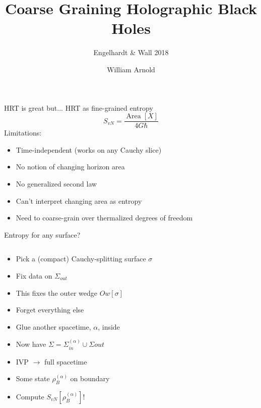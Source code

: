 \documentclass{beamer}
\title{Coarse Graining Holographic Black Holes}
\subtitle{Engelhardt \& Wall 2018}
\date{}
\author{William Arnold}
\DeclareMathOperator{\Area}{Area}
\begin{document}
  \frame[plain]{\titlepage}

  \begin{frame}{HRT is great but...}
    HRT as fine-grained entropy 
    $$
    S_{vN} = \frac{\Area[X]}{4G \hbar}
    $$
    \vfill
    Limitations:
    \begin{itemize}[<+(1)->]
      \item Time-independent (works on any Cauchy slice)
      \item No notion of changing horizon area
      \item No generalized second law
      \item Can't interpret changing area as entropy
      \item Need to coarse-grain over thermalized degrees of freedom
    \end{itemize}
    \vfill
  \end{frame}

  \begin{frame}{Entropy for any surface?}
    \begin{columns}
      \begin{column}{0.4 \linewidth}
        \begin{itemize}[<+(1)->]
          \item Pick a (compact) Cauchy-splitting surface $\sigma$
          \item Fix data on $\Sigma_{out}$
          \item This fixes the outer wedge $Ow[\sigma]$
          \item Forget everything else
          \item Glue another spacetime, $\alpha$, inside 
          \item Now have $\Sigma = \Sigma_{in}^{(\alpha)} \cup \Sigma{out}$
          \item IVP $\rightarrow$ full spacetime
          \item Some state $\rho_B^{(\alpha)}$ on boundary
          \item Compute $S_{vN}[\rho_B^{(\alpha)}]$!
        \end{itemize}

      \end{column}
      \begin{column}{0.6 \linewidth}
        \only<1-4>{
          
        }
      \end{column}
    \end{columns}

  \end{frame}
\end{document}
